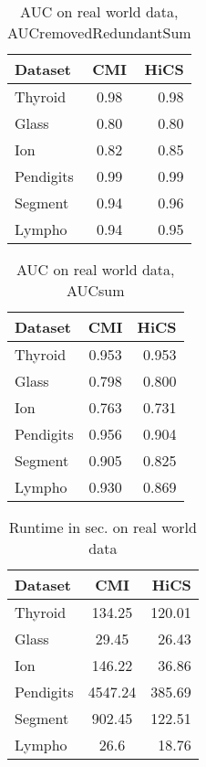 \documentclass[12pt,a4paper]{scrartcl}
\begin{document}
\begin{table}
\begin{center}
 \begin{tabular}{lcr}
 \hline
  Dataset & CMI & HiCS \\
  \hline
  Thyroid & 0.98 &  0.98 \\
  Glass & 0.80 & 0.80 \\
  Ion & 0.82 & 0.85 \\
  Pendigits & 0.99 & 0.99 \\
  Segment & 0.94 & 0.96 \\
  Lympho & 0.94 & 0.95 \\
  \hline

 \end{tabular}
  \caption {AUC on real world data, AUCremovedRedundantSum}
  \end{center}
\end{table} 


\begin{table}
\begin{center}
 \begin{tabular}{lcr}
 \hline
  Dataset & CMI & HiCS \\
  \hline
  Thyroid & 0.953 &  0.953\\
  Glass & 0.798 & 0.800 \\
  Ion & 0.763 & 0.731 \\
  Pendigits & 0.956 & 0.904 \\
  Segment & 0.905 & 0.825 \\
  Lympho & 0.930 & 0.869 \\
  \hline

 \end{tabular}
  \caption {AUC on real world data, AUCsum}
  \end{center}
\end{table} 
 
\begin{table}

\begin{center} 
  \begin{tabular}{lcr}
 \hline
  Dataset & CMI & HiCS \\
  \hline
  Thyroid & 134.25 & 120.01  \\
  Glass & 29.45 & 26.43 \\
  Ion & 146.22 & 36.86 \\
  Pendigits & 4547.24 & 385.69 \\
  Segment & 902.45 & 122.51 \\
  Lympho & 26.6 & 18.76 \\
  \hline
 \end{tabular}
  \caption {Runtime in sec. on real world data}
  \end{center}
\end{table} 
  
\end{document}
